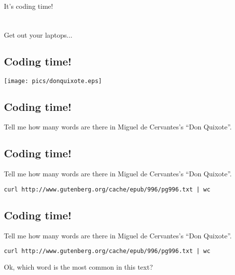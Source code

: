 \documentclass[xga]{xdvislides}
\begin{document}
\newpage
\vspace*{\fill}
\begin{center}
    \Hugesize
        It's coding time! \\ [1em]
    \hspace*{5mm}
    \blueline\\
    \hspace*{5mm}\\
	Get out your laptops...
\end{center}
\vspace*{\fill}

\subsection{Coding time!}
\vspace*{\fill}
\begin{center}
	\texttt{[image: pics/donquixote.eps]}
\end{center}
\vspace*{\fill}

\subsection{Coding time!}
Tell me how many words are there in Miguel de Cervantes's ``Don Quixote''.

\subsection{Coding time!}
Tell me how many words are there in Miguel de Cervantes's ``Don Quixote''.
\\

\begin{verbatim}
curl http://www.gutenberg.org/cache/epub/996/pg996.txt | wc
\end{verbatim}

\subsection{Coding time!}
Tell me how many words are there in Miguel de Cervantes's ``Don Quixote''.
\\

\begin{verbatim}
curl http://www.gutenberg.org/cache/epub/996/pg996.txt | wc
\end{verbatim}
\vspace{.5in}

Ok, which word is the most common in this text?
\end{document}
